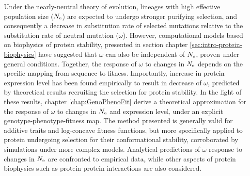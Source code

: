 Under the nearly-neutral theory of evolution, lineages with high effective population size ($N_{\textrm{e}}$) are expected to undergo stronger purifying selection, and consequently a decrease in substitution rate of selected mutations relative to the substitution rate of neutral mutation ($\omega$).
However, computational models based on biophysics of protein stability, presented in section chapter \ref{sec:intro-protein-biophysics} have suggested that $\omega$ can also be independent of $N_{\textrm{e}}$, proven under general conditions.
Together, the response of $\omega$ to changes in $N_{\textrm{e}}$ depends on the specific mapping from sequence to fitness.
Importantly, increase in protein expression level has been found empirically to result in decrease of $\omega$, predicted by theoretical results recruiting the selection for protein stability.
In the light of these results, chapter \ref{chap:GenoPhenoFit} derive a theoretical approximation for the response of $\omega$ to changes in $N_{\textrm{e}}$ and expression level, under an explicit genotype-phenotype-fitness map.
The method presented is generally valid for additive traits and log-concave fitness functions, but more specifically applied to protein undergoing selection for their conformational stability, corroborated by simulations under more complex models.
Analytical predictions of $\omega$ response to changes in $N_{\textrm{e}}$ are confronted to empirical data, while other aspects of protein biophysics such as protein-protein interactions are also considered.

